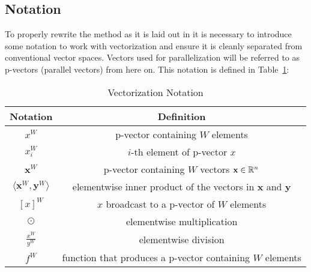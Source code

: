 \documentclass[a4paper, 11pt]{memoir}
\begin{document}
    \subsection{Notation}
    To properly rewrite the method as it is laid out in \cite{Rhodin:2015} it is
    necessary to introduce some notation to work with vectorization and ensure it is
    cleanly separated from conventional vector spaces. Vectors used for parallelization
    will be referred to as p-vectors (parallel vectors) from here on. This notation is
    defined in Table~\ref{tab:notation}:
    \begin{table}[H]
        \centering
        \begin{tabular}{|c|c|}
            \hline
            Notation & Definition \\
            \hline
            $x^W$ & p-vector containing $W$ elements\\
            $x^W_i$ & $i$-th element of p-vector $x$\\
            $\mathbf{x}^W$ & p-vector containing $W$ vectors $\mathbf{x} \in \mathbb{R}^n$\\
            $\langle \mathbf{x}^W, \mathbf{y}^W \rangle$ & elementwise inner product of the vectors in $\mathbf{x}$ and $\mathbf{y}$\\
            $[ x ]^W$ & $x$ broadcast to a p-vector of $W$ elements\\
            $\odot$ & elementwise multiplication\\
            $\frac{x^W}{y^W}$ & elementwise division\\
            $f^W$ & function that produces a p-vector containing $W$ elements\\\hline
        \end{tabular}
        \caption{Vectorization Notation}
        \label{tab:notation}
    \end{table}
\end{document}
